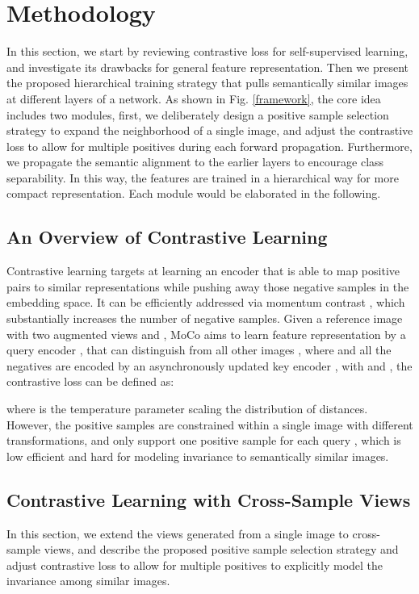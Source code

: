 \documentclass[10pt,twocolumn,letterpaper]{article}
\begin{document}
\section{Methodology}
In this section, we start by reviewing contrastive loss for self-supervised learning, and investigate its drawbacks for general feature representation. Then we present the proposed hierarchical training strategy that pulls semantically similar images at different layers of a network. As shown in Fig. \ref{framework}, the core idea includes two modules, first, we deliberately design a positive sample selection strategy to expand the neighborhood of a single image, and adjust the contrastive loss to allow for multiple positives during each forward propagation. Furthermore, we propagate the semantic alignment to the earlier layers to encourage class separability. In this way, the features are trained in a hierarchical way for more compact representation. Each module would be elaborated in the following.

\subsection{An Overview of Contrastive Learning}










Contrastive learning targets at learning an encoder that is able to map positive pairs to similar representations while pushing away those negative samples in the embedding space. It can be efficiently addressed via momentum contrast \cite{he2020momentum}, which substantially increases the number of negative samples. Given a reference image with two augmented views  and , MoCo aims to learn feature representation  by a query encoder , that can distinguish  from all other images , where  and all the negatives  are encoded by an asynchronously updated key encoder , with  and , the contrastive loss can be defined as:



\noindent where  is the temperature parameter scaling the distribution of distances. However, the positive samples are constrained within a single image with different transformations, and only support one positive sample for each query , which is low efficient and hard for modeling invariance to semantically similar images.


\subsection{Contrastive Learning with Cross-Sample Views}
In this section, we extend the views generated from a single image to cross-sample views, and describe the proposed positive sample selection strategy and adjust contrastive loss to allow for multiple positives to explicitly model the invariance among similar images.
\end{document}
